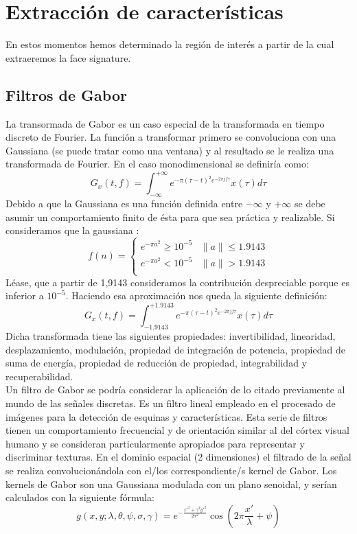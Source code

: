 \newpage

\section{Extracción de características}
En estos momentos hemos determinado la región de interés a partir de la cual extraeremos la face signature. 
\subsection{Filtros de Gabor}
La transormada de Gabor es un caso especial de la transformada en tiempo discreto de Fourier. La función a transformar primero se convoluciona con una Gaussiana (se puede tratar como una ventana) y al resultado se le realiza una transformada de Fourier. En el caso monodimensional se definiría como:\\
\[
	G_{x}(t,f)=\int_{-\infty}^{+\infty}{e^{-\pi(\tau-t)^ 2e^{-2\pi jf \tau}}x(\tau)d\tau}
\]
	Debido a que la Gaussiana es una función definida entre $-\infty$ y $+\infty$ se debe asumir un comportamiento finito de ésta para que sea práctica y realizable. Si consideramos que la gaussiana :
\[
f(n) =  
\begin{cases}
	e^{-\pi a^2}\geq 10^{-5} & \parallel a \parallel \leq 1.9143 \\
	e^{-\pi a^2} < 10^{-5} & \parallel a \parallel > 1.9143 \\
\end{cases}
\]
Léase, que a partir de 1,9143 consideramos la contribución despreciable porque es inferior a $10^{-5}$. Haciendo esa aproximación nos queda la siguiente definición:
\[
	G_{x}(t,f)=\int_{-1.9143}^{+1.9143}{e^{-\pi(\tau-t)^ 2e^{-2\pi jf \tau}}x(\tau)d\tau}
\]
Dicha transformada tiene las siguientes propiedades: invertibilidad, linearidad, desplazamiento, modulación, propiedad de integración de potencia, propiedad de suma de energía, propiedad de reducción de propiedad, integrabilidad y recuperabilidad.\\
Un filtro de Gabor \cite{Lee96imagerepresentation} se podría considerar la aplicación de lo citado previamente al mundo de las señales discretas. Es un filtro lineal empleado en el procesado de imágenes para la detección de esquinas y características. Esta serie de filtros tienen un comportamiento frecuencial y de orientación similar al del córtex visual humano\cite{DaugmanCortexReceptors} y se consideran particularmente apropiados para representar y discriminar texturas. En el dominio espacial (2 dimensiones) el filtrado de la señal se realiza convolucionándola con el/los correspondiente/s kernel de Gabor. Los kernels de Gabor son una Gaussiana modulada con un plano senoidal\cite{DaugmanGaborTransforms}, y serían calculados con la siguiente fórmula:
\[
g(x,y;\lambda,\theta,\psi,\sigma,\gamma)=e^{-\frac{x'^2+\gamma^2y'^2}{2\sigma^2}}\cos\left(2\pi\frac{x'}{\lambda}+\psi\right)
\]


